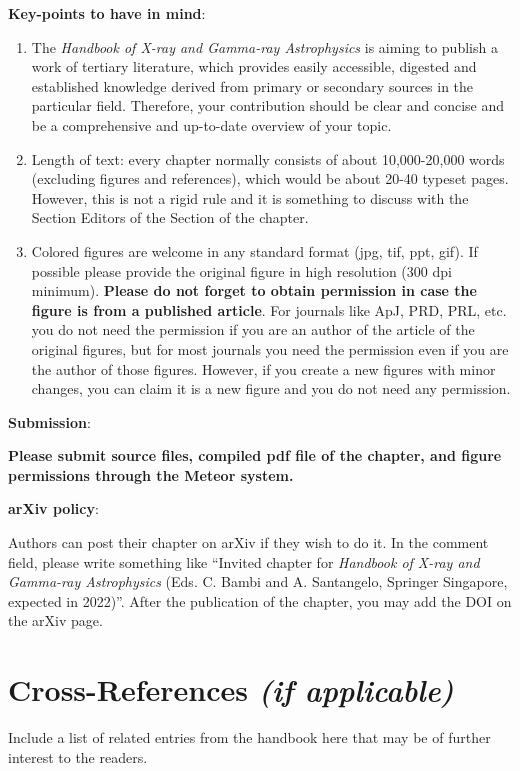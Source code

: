 \documentclass[graybox, nosecnum]{svmult}
\begin{document}
\vspace{0.3cm}

{\bf Key-points to have in mind}:
\begin{enumerate}
\item The {\it Handbook of X-ray and Gamma-ray Astrophysics} is aiming to publish a work of tertiary literature, which provides easily accessible, digested and established knowledge derived from primary or secondary sources in the particular field. Therefore, your contribution should be clear and concise and be a comprehensive and up-to-date overview of your topic.
\item Length of text: every chapter normally consists of about 10,000-20,000 words (excluding figures and references), which would be about 20-40 typeset pages. However, this is not a rigid rule and it is something to discuss with the Section Editors of the Section of the chapter.
\item Colored figures are welcome in any standard format (jpg, tif, ppt, gif). If possible please provide the original figure in high resolution (300 dpi minimum). {\color{red}\bf Please do not forget to obtain permission in case the figure is from a published article}. For journals like ApJ, PRD, PRL, etc. you do not need the permission if you are an author of the article of the original figures, but for most journals you need the permission even if you are the author of those figures. However, if you create a new figures with minor changes, you can claim it is a new figure and you do not need any permission.
\end{enumerate}


\vspace{0.5cm}

{\bf Submission}:

\vspace{0.1cm}

{\color{red} \bf Please submit source files, compiled pdf file of the chapter, and figure permissions through the Meteor system.}

\vspace{0.5cm}

{\bf arXiv policy}:

\vspace{0.1cm}

{Authors can post their chapter on arXiv if they wish to do it. In the comment field, please write something like ``Invited chapter for {\it Handbook of X-ray and Gamma-ray Astrophysics} (Eds. C. Bambi and A. Santangelo, Springer Singapore, expected in 2022)''. After the publication of the chapter, you may add the DOI on the arXiv page.}



\section{Cross-References \textit{(if applicable)}}
Include a list of related entries from the handbook here that may be of further interest to the readers.



\end{document}
